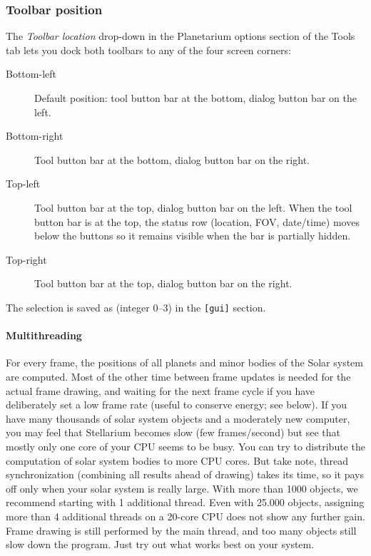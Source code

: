 \subsubsection{Toolbar position} 
The \emph{Toolbar location} drop-down in the Planetarium options section of the Tools tab lets you
dock both toolbars to any of the four screen corners:
\begin{description}
\item[Bottom-left] Default position: tool button bar at the bottom, dialog button bar on the left.
\item[Bottom-right] Tool button bar at the bottom, dialog button bar on the right.
\item[Top-left] Tool button bar at the top, dialog button bar on the left. When the tool button bar is at the top,
  the status row (location, FOV, date/time) moves below the buttons so it remains visible when
  the bar is partially hidden.
\item[Top-right] Tool button bar at the top, dialog button bar on the right.
\end{description}
The selection is saved as  (integer 0--3) in the \texttt{[gui]} section.

\paragraph{Multithreading} \label{sec:gui:configuration:tools:threads} 
For every frame, the positions of all planets and minor bodies of the Solar system are computed. 
Most of the other time between frame updates is needed for the actual frame drawing, 
and waiting for the next frame cycle if you have deliberately set a low frame rate (useful to conserve energy; see below). 
If you have many thousands of solar system objects and a moderately new computer, 
you may feel that Stellarium becomes slow (few frames/second) but see that mostly only one core of your CPU seems to be busy.  
You can try to distribute the computation of solar system bodies to more CPU cores. 
But take note, thread synchronization (combining all results ahead of drawing) takes its time, 
so it pays off only when your solar system is really large. 
With more than 1000 objects, we recommend starting with 1 additional thread. 
Even with 25.000 objects, assigning more than 4 additional threads on a 20-core CPU does not show any further gain. 
Frame drawing is still performed by the main thread, and too many objects still slow down the program. 
Just try out what works best on your system.

